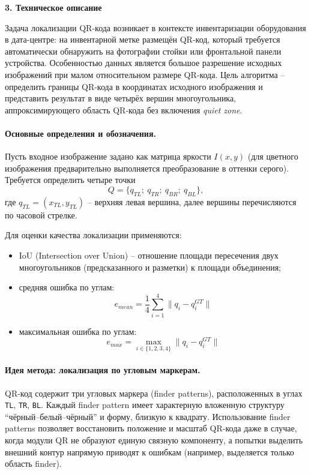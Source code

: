 \newpage
\begin{center}
	\textbf{\large 3. Техническое описание}
\end{center}

Задача локализации QR-кода возникает в контексте инвентаризации оборудования в дата-центре: на инвентарной метке размещён QR-код, который требуется автоматически обнаружить на фотографии стойки или фронтальной панели устройства.
Особенностью данных является большое разрешение исходных изображений при малом относительном размере QR-кода.
Цель алгоритма -- определить границы QR-кода в координатах исходного изображения и представить результат в виде четырёх вершин многоугольника, аппроксимирующего область QR-кода без включения \textit{quiet zone}.

\paragraph{Основные определения и обозначения.}
Пусть входное изображение задано как матрица яркости $I(x, y)$ (для цветного изображения предварительно выполняется преобразование в оттенки серого).
Требуется определить четыре точки
\[
	Q = \{q_{TL};\ q_{TR};\ q_{BR};\ q_{BL}\},
\]
где $q_{TL}=(x_{TL}, y_{TL})$ -- верхняя левая вершина, далее вершины перечисляются по часовой стрелке.

Для оценки качества локализации применяются:
\begin{itemize}
	\item IoU (Intersection over Union) -- отношение площади пересечения двух многоугольников (предсказанного и разметки) к площади объединения;
	\item средняя ошибка по углам:
	      $$ e_{mean}=\frac{1}{4}\sum_{i=1}^{4} \|q_i - q_i^{GT}\| $$
	\item максимальная ошибка по углам:
	      $$ e_{max}=\max_{i\in\{1,2,3,4\}} \|q_i - q_i^{GT}\| $$
\end{itemize}

\paragraph{Идея метода: локализация по угловым маркерам.}
QR-код содержит три угловых маркера (finder patterns), расположенных в углах \texttt{TL}, \texttt{TR}, \texttt{BL}.
Каждый finder pattern имеет характерную вложенную структуру ``чёрный--белый--чёрный'' и форму, близкую к квадрату.
Использование finder patterns позволяет восстановить положение и масштаб QR-кода даже в случае, когда модули QR не образуют единую связную компоненту, а попытки выделить внешний контур напрямую приводят к ошибкам (например, выделяется только область finder).

